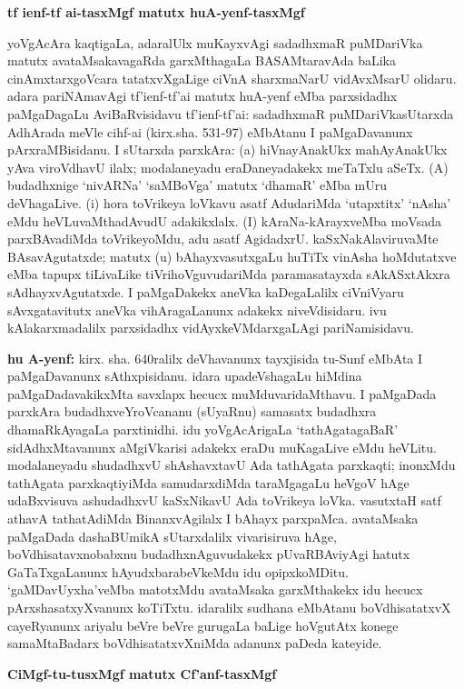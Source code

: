 \begin{center}
{\textbf{\Large tf ienf-tf ai-tasxMgf matutx huA-yenf-tasxMgf}}
\end{center}

yoVgAcAra kaqtigaLa, adaralUlx muKayxvAgi sadadhxmaR puMDariVka matutx avataMsakavagaRda garxMthagaLa BASAMtaravAda baLika cinAmxtarxgoVcara tatatxvXgaLige ciVnA sharxmaNarU vidAvxMsarU olidaru. adara pariNAmavAgi tf'ienf-tf'ai matutx huA-yenf eMba parxsidadhx paMgaDagaLu AviBaRvisidavu tf'ienf-tf'ai: sadadhxmaR puMDariVkasUtarxda AdhArada meVle cihf-ai (kirx.sha. 531-97) eMbAtanu I paMgaDavanunx pArxraMBisidanu. I sUtarxda parxkAra: (a) hiVnayAnakUkx mahAyAnakUkx yAva viroVdhavU ilalx; modalaneyadu eraDaneyadakekx meTaTxlu aSeTx. (A) budadhxnige `nivARNa' `saMBoVga' matutx `dhamaR' eMba mUru deVhagaLive. (i) hora toVrikeya loVkavu asatf AdudariMda `utapxtitx' `nAsha' eMdu heVLuvaMthadAvudU adakikxlalx. (I) kAraNa-kArayxveMba moVsada parxBAvadiMda toVrikeyoMdu, adu asatf AgidadxrU. kaSxNakAlaviruvaMte BAsavAgutatxde; matutx (u) bAhayxvasutxgaLu huTiTx vinAsha hoMdutatxve eMba tapupx tiLivaLike tiVrihoVguvudariMda paramasatayxda sAkASxtAkxra sAdhayxvAgutatxde. I paMgaDakekx aneVka kaDegaLalilx ciVniVyaru sAvxgatavitutx aneVka vihAragaLanunx adakekx niveVdisidaru. ivu kAlakarxmadalilx parxsidadhx vidAyxkeVMdarxgaLAgi pariNamisidavu.

{\bf hu A-yenf:} kirx. sha. 640ralilx deVhavanunx tayxjisida tu-Sunf eMbAta I paMgaDavanunx sAthxpisidanu. idara upadeVshagaLu hiMdina paMgaDadavakikxMta savxlapx hecucx muMduvaridaMthavu. I paMgaDada parxkAra budadhxveYroVcananu (sUyaRnu) samasatx budadhxra dhamaRkAyagaLa parxtinidhi. idu yoVgAcArigaLa `tathAgatagaBaR' sidAdhxMtavanunx aMgiVkarisi adakekx eraDu muKagaLive eMdu heVLitu. modalaneyadu shudadhxvU shAshavxtavU Ada tathAgata parxkaqti; inonxMdu tathAgata parxkaqtiyiMda samudarxdiMda taraMgagaLu heVgoV hAge udaBxvisuva ashudadhxvU kaSxNikavU Ada toVrikeya loVka. vasutxtaH satf athavA tathatAdiMda BinanxvAgilalx I bAhayx parxpaMca. avataMsaka paMgaDada dashaBUmikA sUtarxdalilx vivarisiruva hAge, boVdhisatavxnobabxnu budadhxnAguvudakekx pUvaRBAviyAgi hatutx GaTaTxgaLanunx hAyudxbarabeVkeMdu idu opipxkoMDitu. `gaMDavUyxha'veMba matotxMdu avataMsaka garxMthakekx idu hecucx pArxshasatxyXvanunx koTiTxtu. idaralilx sudhana eMbAtanu boVdhisatatxvX cayeRyanunx ariyalu beVre beVre gurugaLa baLige hoVgutAtx konege samaMtaBadarx boVdhisatatxvXniMda adanunx paDeda kateyide.

\begin{center}
{\textbf{\Large CiMgf-tu-tusxMgf matutx Cf'anf-tasxMgf}}
\end{center}

